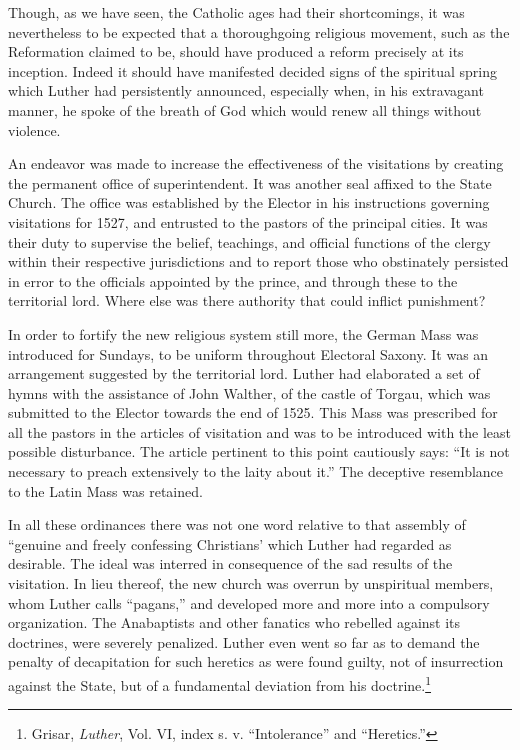 Though, as we have seen, the Catholic ages had their
shortcomings, it was nevertheless to be expected that a thoroughgoing
religious movement, such as the Reformation claimed to be,
should have produced a reform precisely at its inception. Indeed it
should have manifested decided signs of the spiritual spring which
Luther had persistently announced, especially when, in his extravagant
manner, he spoke of the breath of God which would renew all
things without violence.

An endeavor was made to increase the effectiveness of the visitations
by creating the permanent office of superintendent. It was another seal
affixed to the State Church. The office was established by the Elector
in his instructions governing visitations for 1527, and entrusted to the
pastors of the principal cities. It was their duty to supervise the belief,
teachings, and official functions of the clergy within their respective
jurisdictions and to report those who obstinately persisted in error to
the officials appointed by the prince, and through these to the territorial
lord. Where else was there authority that could inflict punishment?

In order to fortify the new religious system still more, the German
Mass was introduced for Sundays, to be uniform throughout Electoral
Saxony. It was an arrangement suggested by the territorial lord.
Luther had elaborated a set of hymns with the assistance of John
Walther, of the castle of Torgau, which was submitted to the Elector
towards the end of 1525. This Mass was prescribed for all the pastors
in the articles of visitation and was to be introduced with the least
possible disturbance. The article pertinent to this point cautiously
says: “It is not necessary to preach extensively to the laity about it.”
The deceptive resemblance to the Latin Mass was retained.

In all these ordinances there was not one word relative to that assembly
of “genuine and freely confessing Christians’ which Luther
had regarded as desirable. The ideal was interred in consequence of the
sad results of the visitation. In lieu thereof, the new church was overrun
by unspiritual members, whom Luther calls “pagans,” and developed more
and more into a compulsory organization. The Anabaptists
and other fanatics who rebelled against its doctrines, were
severely penalized. Luther even went so far as to demand the penalty
of decapitation for such heretics as were found guilty, not of insurrection
against the State, but of a fundamental deviation from his
doctrine.\footnote{Grisar, \textit{Luther}, Vol. VI, index s. v. “Intolerance” and “Heretics.”}

